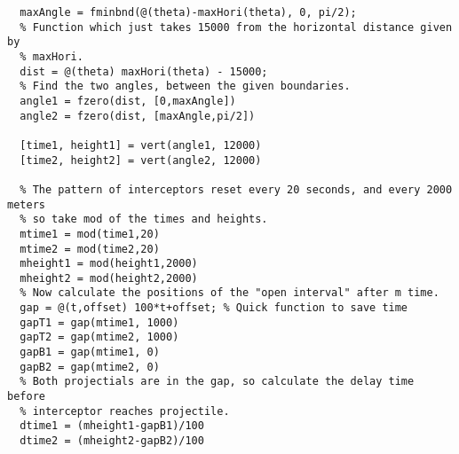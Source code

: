 \documentclass[12pt]{article}
\begin{document}
\begin{lstlisting}[caption={Question 2 main code},label={2_main}]
  % Find the exact angle associated with the max horizontal distance.
  maxAngle = fminbnd(@(theta)-maxHori(theta), 0, pi/2);
  % Function which just takes 15000 from the horizontal distance given by
  % maxHori.
  dist = @(theta) maxHori(theta) - 15000;
  % Find the two angles, between the given boundaries.
  angle1 = fzero(dist, [0,maxAngle])
  angle2 = fzero(dist, [maxAngle,pi/2])

  [time1, height1] = vert(angle1, 12000)
  [time2, height2] = vert(angle2, 12000)

  % The pattern of interceptors reset every 20 seconds, and every 2000 meters
  % so take mod of the times and heights.
  mtime1 = mod(time1,20)
  mtime2 = mod(time2,20)
  mheight1 = mod(height1,2000)
  mheight2 = mod(height2,2000)
  % Now calculate the positions of the "open interval" after m time.
  gap = @(t,offset) 100*t+offset; % Quick function to save time
  gapT1 = gap(mtime1, 1000)
  gapT2 = gap(mtime2, 1000)
  gapB1 = gap(mtime1, 0)
  gapB2 = gap(mtime2, 0)
  % Both projectials are in the gap, so calculate the delay time before
  % interceptor reaches projectile.
  dtime1 = (mheight1-gapB1)/100
  dtime2 = (mheight2-gapB2)/100
\end{lstlisting}
\end{document}
